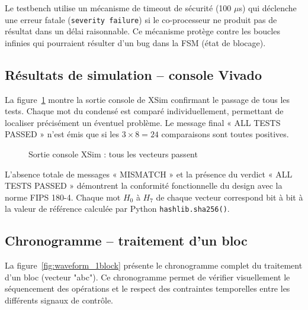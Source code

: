 Le testbench utilise un mécanisme de timeout de sécurité (100 $\mu$s) qui déclenche une erreur fatale (\texttt{severity failure}) si le co-processeur ne produit pas de résultat dans un délai raisonnable. Ce mécanisme protège contre les boucles infinies qui pourraient résulter d'un bug dans la FSM (état de blocage).

\subsection{Résultats de simulation -- console Vivado}

La figure~\ref{fig:sim_console} montre la sortie console de XSim confirmant le passage de tous les tests. Chaque mot du condensé est comparé individuellement, permettant de localiser précisément un éventuel problème. Le message final « ALL TESTS PASSED » n'est émis que si les $3 \times 8 = 24$ comparaisons sont toutes positives.

\begin{figure}[H]
\centering
%
\caption{Sortie console XSim : tous les vecteurs passent}
\label{fig:sim_console}
\end{figure}

L'absence totale de messages « MISMATCH » et la présence du verdict « ALL TESTS PASSED » démontrent la conformité fonctionnelle du design avec la norme FIPS 180-4. Chaque mot $H_0$ à $H_7$ de chaque vecteur correspond bit à bit à la valeur de référence calculée par Python \texttt{hashlib.sha256()}.

\subsection{Chronogramme -- traitement d'un bloc}

La figure~\ref{fig:waveform_1block} présente le chronogramme complet du traitement d'un bloc (vecteur "abc"). Ce chronogramme permet de vérifier visuellement le séquencement des opérations et le respect des contraintes temporelles entre les différents signaux de contrôle.

